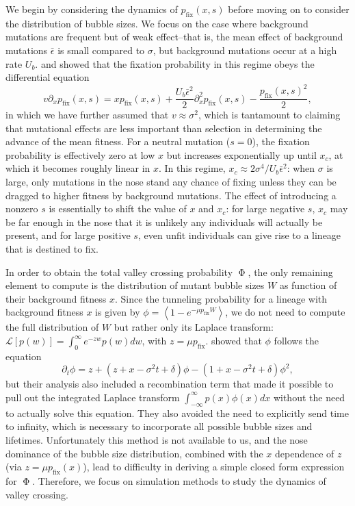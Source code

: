 \documentclass[rmp]{revtex4}
\newcommand{\pfix}{p_{\mathrm{fix}}}
\begin{document}
\begin{spacing}{1.5}
We begin by considering the dynamics of $\pfix(x,s)$ before moving on to consider the distribution of bubble sizes.
We focus on the case where background mutations are frequent but of weak effect--that is, the mean effect of background mutations $\bar{\epsilon}$ is small compared to $\sigma$, but background mutations occur at a high rate $U_b$.
\citet{hallatschek_2011} and \citet{good_2014} showed that the fixation probability in this regime obeys the differential equation 
\begin{equation}
v\partial_x \pfix(x,s) = x \pfix(x,s) + \frac{U_b\bar{\epsilon}^2}{2}\partial_x^2 \pfix(x,s) - \frac{\pfix(x,s)^2}{2},
\end{equation}
in which we have further assumed that $v \approx \sigma^2$, which is tantamount to claiming that mutational effects are less important than selection in determining the advance of the mean fitness.
For a neutral mutation ($s = 0$), the fixation probability is effectively zero at low $x$ but increases exponentially up until $x_c$, at which it becomes roughly linear in $x$.
In this regime, $x_c \approx 2\sigma^4/U_b\bar{\epsilon}^2$: when $\sigma$ is large, only mutations in the nose stand any chance of fixing unless they can be dragged to higher fitness by background mutations.
The effect of introducing a nonzero $s$ is essentially to shift the value of $x$ and $x_c$: for large negative $s$, $x_c$ may be far enough in the nose that it is unlikely any individuals will actually be present, and for large positive $s$, even unfit individuals can give rise to a lineage that is destined to fix.

In order to obtain the total valley crossing probability $\upPhi$, the only remaining element to compute is the distribution of mutant bubble sizes $W$ as function of their background fitness $x$.
Since the tunneling probability for a lineage with background fitness $x$ is given by $\phi = \left< 1 - e^{-\mu \pfix W} \right>$, we do not need to compute the full distribution of $W$ but rather only its Laplace transform: $\mathcal{L}\left[ p(w) \right] = \int_0^\infty e^{-zw} p(w) dw$, with $z = \mu \pfix$.
\citet{neher_shraiman_2011} showed that $\phi$ follows the equation
\begin{equation}
\partial_t \phi = z + (z + x - \sigma^2 t + \delta)\phi - (1 + x - \sigma^2 t + \delta)\phi^2,
\end{equation}
but their analysis also included a recombination term that made it possible to pull out the integrated Laplace transform $\int_{-\infty}^\infty p(x) \phi(x) dx$ without the need to actually solve this equation.
They also avoided the need to explicitly send time to infinity, which is necessary to incorporate all possible bubble sizes and lifetimes.
Unfortunately this method is not available to us, and the nose dominance of the bubble size distribution, combined with the $x$ dependence of $z$ (via $z = \mu \pfix(x)$), lead to difficulty in deriving a simple closed form expression for $\upPhi$.
Therefore, we focus on simulation methods to study the dynamics of valley crossing.


\end{spacing}
\end{document}
